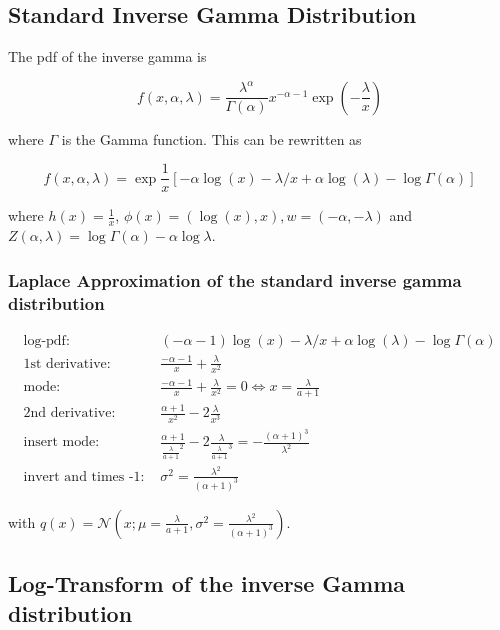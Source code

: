 \subsection{Standard Inverse Gamma Distribution}

The pdf of the inverse gamma is 

\begin{equation}
	f(x, \alpha, \lambda) = \frac{\lambda^{\alpha}}{\Gamma(\alpha)} x^{-\alpha-1} \exp(-\frac{\lambda}{x})
	\label{eq:pdf_inverse_gamma}
\end{equation}

where $\Gamma$ is the Gamma function. This can be rewritten as

\begin{equation}
	f(x, \alpha, \lambda) = \exp \frac{1}{x}\left[-\alpha\log(x) - \lambda/x + \alpha \log(\lambda) -\log\Gamma(\alpha)\right]
	\label{eq:exp_inverse_gamma}
\end{equation}

where $h(x) = \frac{1}{x}$, $\phi(x)=(\log(x), x), w= (-\alpha, -\lambda)$ and $Z(\alpha,\lambda) = \log\Gamma(\alpha) - \alpha\log\lambda$.

\subsubsection{Laplace Approximation of the standard inverse gamma distribution}

\begin{align*}
\text{log-pdf: } &(-\alpha-1)\log(x) - \lambda/x + \alpha \log(\lambda) -\log\Gamma(\alpha) \\
\text{1st derivative: }&  \frac{-\alpha-1}{x} + \frac{\lambda}{x^2}\\
\text{mode: }& \frac{-\alpha-1}{x} + \frac{\lambda}{x^2} = 0 \Leftrightarrow x = \frac{\lambda}{a+1}\\
\text{2nd derivative: }&  \frac{\alpha+1}{x^2} - 2\frac{\lambda}{x^3}\\
\text{insert mode: }& \frac{\alpha+1}{\frac{\lambda}{a+1}^2} - 2\frac{\lambda}{\frac{\lambda}{a+1}^3} = -\frac{(\alpha +1)^3}{\lambda^2} \\
\text{invert and times -1: }&\sigma^2 = \frac{\lambda^2}{(\alpha +1)^3}
\end{align*}

with $q(x) = \mathcal{N}(x; \mu = \frac{\lambda}{a+1}, \sigma^2 =\frac{\lambda^2}{(\alpha +1)^3} )$. 

\subsection{Log-Transform of the inverse Gamma distribution}

